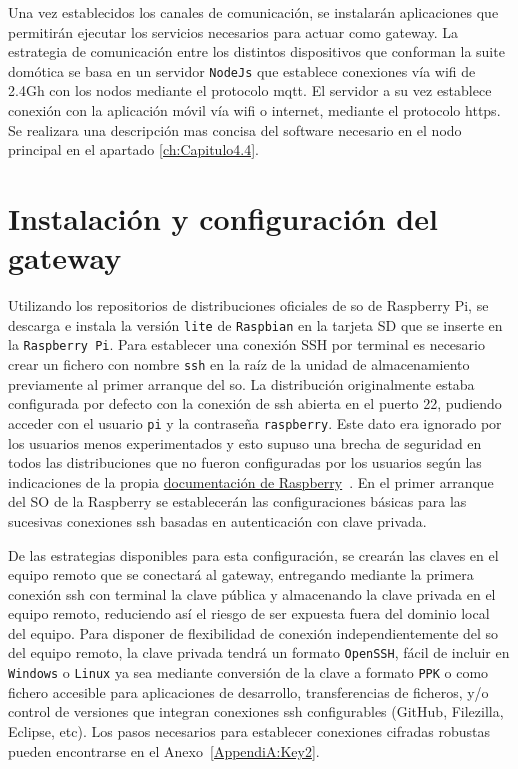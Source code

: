 Una vez establecidos los canales de comunicación, se instalarán aplicaciones que permitirán ejecutar los servicios necesarios para actuar como \gls{gateway}. La estrategia de comunicación entre los distintos dispositivos que conforman la suite domótica se basa en un servidor \verb|NodeJs| que establece conexiones vía \gls{wifi} de 2.4Gh con los nodos mediante el protocolo \gls{mqtt}. El servidor a su vez establece conexión con la aplicación móvil vía \gls{wifi} o internet, mediante el protocolo \gls{https}. Se realizara una descripción mas concisa del software necesario en el nodo principal en el apartado \ref{ch:Capitulo4.4}.


\section{Instalación y configuración del gateway}
\label{ch:Capitulo4.3}
 Utilizando los repositorios de distribuciones oficiales de \gls{so} de Raspberry Pi, se descarga e instala la versión \verb|lite| de \verb|Raspbian| en la tarjeta SD que se inserte en la \verb|Raspberry Pi|. Para establecer una conexión SSH por terminal es necesario crear un fichero con nombre \verb|ssh| en la raíz de la unidad de almacenamiento previamente al primer arranque del \gls{so}. La distribución originalmente estaba configurada por defecto con la conexión de \gls{ssh} abierta en el puerto 22, pudiendo acceder con el usuario \verb|pi| y la contraseña \verb|raspberry|. Este dato era ignorado por los usuarios menos experimentados y esto supuso una brecha de seguridad en todos las distribuciones que no fueron configuradas por los usuarios según las indicaciones de la propia \href{https://www.raspberrypi.org/documentation/configuration/security.md}{documentación de Raspberry}~\cite{securingyourraspberrypi}. En el primer arranque del SO de la Raspberry se establecerán las configuraciones básicas para las sucesivas conexiones \gls{ssh} basadas en autenticación con clave privada.
 
 \vspace{1cm}

 De las estrategias disponibles para esta configuración, se crearán las claves en el equipo remoto que se conectará al \gls{gateway}, entregando mediante la primera conexión \gls{ssh} con terminal la clave pública y almacenando la clave privada en el equipo remoto, reduciendo así el riesgo de ser expuesta fuera del dominio local del equipo. Para disponer de flexibilidad de conexión independientemente del \gls{so} del equipo remoto, la clave privada tendrá un formato \verb|OpenSSH|, fácil de incluir en \verb|Windows| o \verb|Linux| ya sea mediante conversión de la clave a formato \verb|PPK| o como fichero accesible para aplicaciones de desarrollo, transferencias de ficheros, y/o control de versiones que integran conexiones \gls{ssh} configurables (GitHub, Filezilla, Eclipse, etc). Los pasos necesarios para establecer conexiones cifradas robustas pueden encontrarse en el Anexo~\ref{AppendiA:Key2}.

